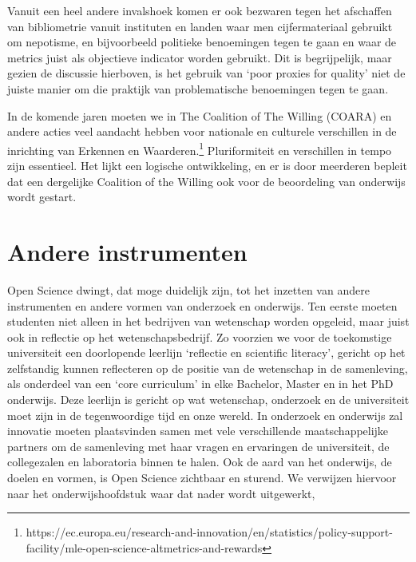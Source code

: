 \documentclass[empirical, authordate, ]{new-jote-article}
\begin{document}
	Vanuit een heel andere invalshoek komen er ook bezwaren tegen het afschaffen van bibliometrie vanuit instituten en landen waar men cijfermateriaal gebruikt om nepotisme, en bijvoorbeeld politieke benoemingen tegen te gaan en waar de metrics juist als objectieve indicator worden gebruikt. Dit is begrijpelijk, maar gezien de discussie hierboven, is het gebruik van ‘poor proxies for quality' niet de juiste manier om die praktijk van problematische benoemingen tegen te gaan.



	In de komende jaren moeten we in The Coalition of The Willing (COARA) en andere acties veel aandacht hebben voor nationale en culturele verschillen in de inrichting van Erkennen en Waarderen.\footnote{https://ec.europa.eu/research-and-innovation/en/statistics/policy-support-facility/mle-open-science-altmetrics-and-rewards} Pluriformiteit en verschillen in tempo zijn essentieel. Het lijkt een logische ontwikkeling, en er is door meerderen bepleit dat een dergelijke Coalition of the Willing ook voor de beoordeling van onderwijs wordt gestart.



	\section{Andere instrumenten}



	Open Science dwingt, dat moge duidelijk zijn, tot het inzetten van andere instrumenten en andere vormen van onderzoek en onderwijs. Ten eerste moeten studenten niet alleen in het bedrijven van wetenschap worden opgeleid, maar juist ook in reflectie op het wetenschapsbedrijf. Zo voorzien we voor de toekomstige universiteit een doorlopende leerlijn ‘reflectie en scientific literacy', gericht op het zelfstandig kunnen reflecteren op de positie van de wetenschap in de samenleving, als onderdeel van een ‘core curriculum' in elke Bachelor, Master en in het PhD onderwijs. Deze leerlijn is gericht op wat wetenschap, onderzoek en de universiteit moet zijn in de tegenwoordige tijd en onze wereld. In onderzoek en onderwijs zal innovatie moeten plaatsvinden samen met vele verschillende maatschappelijke partners om de samenleving met haar vragen en ervaringen de universiteit, de collegezalen en laboratoria binnen te halen. Ook de aard van het onderwijs, de doelen en vormen, is Open Science zichtbaar en sturend. We verwijzen hiervoor naar het onderwijshoofdstuk waar dat nader wordt uitgewerkt,
\end{document}
